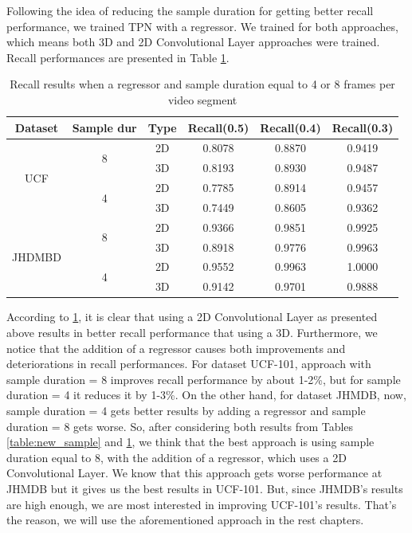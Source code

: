 Following the idea of reducing the sample duration for getting better recall performance, we trained TPN with a regressor. We trained for both approaches, which means both 3D and 2D Convolutional
Layer approaches were trained. Recall performances are presented in Table \ref{table:new_sample_reg}.

\begin{table}[h]
  \centering
  \begin{tabular}{|c | c | c || c c c|}
    \hline
    \textbf{Dataset} & \textbf{Sample dur} & \textbf{Type} & \textbf{Recall(0.5)} &  \textbf{Recall(0.4)} &  \textbf{Recall(0.3)} \\
    \hline
    \multirow{4}{*}{UCF} & \multirow{2}{*}{8} & 2D & 0.8078 & 0.8870 & 0.9419 \\
    \cline{3-6}
    {} & {} & 3D & 0.8193 & 0.8930 & 0.9487 \\
    \cline{2-6}
    {} & \multirow{2}{*}{4}& 2D & 0.7785 & 0.8914 & 0.9457 \\
    \cline{3-6}
    {} & {} & 3D & 0.7449 & 0.8605 & 0.9362 \\
    \hline
    \multirow{4}{*}{JHDMBD} & \multirow{2}{*}{8} & 2D &  0.9366 & 0.9851 & 0.9925  \\
    \cline{3-6}
    {} & {} & 3D & 0.8918 & 0.9776 & 0.9963  \\ 
    \cline{2-6}
    {} & \multirow{2}{*}{4}& 2D & 0.9552 & 0.9963 & 1.0000 \\
    \cline{3-6}
    {} & {} & 3D & 0.9142 & 0.9701 & 0.9888  \\
    \hline
    
  \end{tabular}
  \caption{Recall results when a regressor and sample duration equal to 4 or 8 frames per video segment}
  \label{table:new_sample_reg}
\end{table}

According to \ref{table:new_sample_reg}, it is clear that using a 2D Convolutional Layer as presented above results in better recall performance that using a 3D. Furthermore, we notice that
the addition of a regressor causes both improvements and deteriorations in recall performances. For dataset UCF-101, approach with sample duration = 8 improves recall performance by about 1-2\%,
but for sample duration = 4 it reduces it by 1-3\%. On the other hand, for dataset JHMDB, now, sample duration = 4 gets better results by adding a regressor and sample duration = 8 gets
worse. So, after considering both results from Tables \ref{table:new_sample} and \ref{table:new_sample_reg}, we think that the best approach is using sample duration equal to 8, with the
addition of a regressor, which uses a 2D Convolutional Layer. We know that this approach gets worse performance at JHMDB but it gives us the best results in UCF-101. But, since JHMDB's results are
high enough, we are most interested in improving UCF-101's results. That's the reason, we will use the aforementioned approach in the rest chapters.

